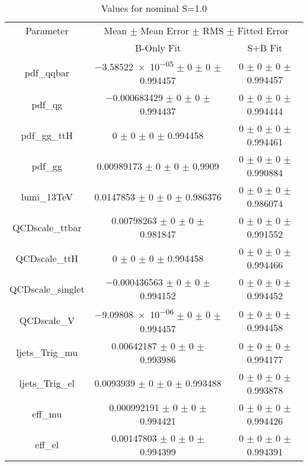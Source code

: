 \begin{table}
\centering
\caption{Values for nominal S=1.0}
\begin{tabular}{ccc}
\toprule
Parameter & \multicolumn{2}{c}{Mean $\pm$ Mean Error $\pm$ RMS $\pm$ Fitted Error}\\
 & B-Only Fit & S+B Fit\\
\midrule
pdf\_qqbar & \num{-3.58522e-05} $\pm$ \num{0} $\pm$ \num{0} $\pm$ \num{0.994457} & \num{0} $\pm$ \num{0} $\pm$ \num{0} $\pm$ \num{0.994457}\\
pdf\_qg & \num{-0.000683429} $\pm$ \num{0} $\pm$ \num{0} $\pm$ \num{0.994437} & \num{0} $\pm$ \num{0} $\pm$ \num{0} $\pm$ \num{0.994444}\\
pdf\_gg\_ttH & \num{0} $\pm$ \num{0} $\pm$ \num{0} $\pm$ \num{0.994458} & \num{0} $\pm$ \num{0} $\pm$ \num{0} $\pm$ \num{0.994461}\\
pdf\_gg & \num{0.00989173} $\pm$ \num{0} $\pm$ \num{0} $\pm$ \num{0.9909} & \num{0} $\pm$ \num{0} $\pm$ \num{0} $\pm$ \num{0.990884}\\
lumi\_13TeV & \num{0.0147853} $\pm$ \num{0} $\pm$ \num{0} $\pm$ \num{0.986376} & \num{0} $\pm$ \num{0} $\pm$ \num{0} $\pm$ \num{0.986074}\\
QCDscale\_ttbar & \num{0.00798263} $\pm$ \num{0} $\pm$ \num{0} $\pm$ \num{0.981847} & \num{0} $\pm$ \num{0} $\pm$ \num{0} $\pm$ \num{0.991552}\\
QCDscale\_ttH & \num{0} $\pm$ \num{0} $\pm$ \num{0} $\pm$ \num{0.994458} & \num{0} $\pm$ \num{0} $\pm$ \num{0} $\pm$ \num{0.994466}\\
QCDscale\_singlet & \num{-0.000436563} $\pm$ \num{0} $\pm$ \num{0} $\pm$ \num{0.994152} & \num{0} $\pm$ \num{0} $\pm$ \num{0} $\pm$ \num{0.994452}\\
QCDscale\_V & \num{-9.09808e-06} $\pm$ \num{0} $\pm$ \num{0} $\pm$ \num{0.994457} & \num{0} $\pm$ \num{0} $\pm$ \num{0} $\pm$ \num{0.994458}\\
ljets\_Trig\_mu & \num{0.00642187} $\pm$ \num{0} $\pm$ \num{0} $\pm$ \num{0.993986} & \num{0} $\pm$ \num{0} $\pm$ \num{0} $\pm$ \num{0.994177}\\
ljets\_Trig\_el & \num{0.0093939} $\pm$ \num{0} $\pm$ \num{0} $\pm$ \num{0.993488} & \num{0} $\pm$ \num{0} $\pm$ \num{0} $\pm$ \num{0.993878}\\
eff\_mu & \num{0.000992191} $\pm$ \num{0} $\pm$ \num{0} $\pm$ \num{0.994421} & \num{0} $\pm$ \num{0} $\pm$ \num{0} $\pm$ \num{0.994426}\\
eff\_el & \num{0.00147803} $\pm$ \num{0} $\pm$ \num{0} $\pm$ \num{0.994399} & \num{0} $\pm$ \num{0} $\pm$ \num{0} $\pm$ \num{0.994391}\\

\end{tabular}
\end{table}
